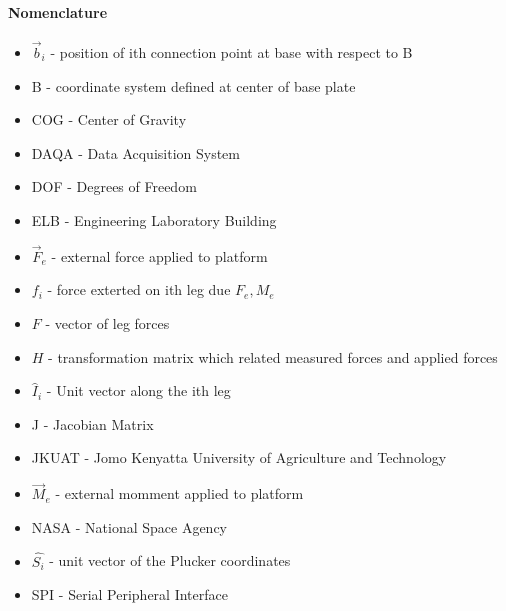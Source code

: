 \paragraph{Nomenclature}
\begin{itemize}
\item $\vec{b}_i$ - position of ith connection point at base with respect to B
\item B - coordinate system defined at center of base plate
\item COG - Center of Gravity
\item DAQA - Data Acquisition System
\item DOF - Degrees of Freedom
\item ELB - Engineering Laboratory Building
\item $\vec{F}_e$ - external force applied to platform
\item $f_i$ - force exterted on ith leg due $F_e, M_e$
\item $F$ - vector of leg forces
\item $H$ - transformation matrix which related measured forces and applied forces
\item $\hat{I}_i$ - Unit vector along the ith leg 
\item J - Jacobian Matrix 
\item JKUAT - Jomo Kenyatta University of Agriculture and Technology
\item $\vec{M}_e$ - external momment applied to platform
\item NASA - National Space Agency
\item $\hat{{S_{i}}}$ - unit vector of the Plucker coordinates
\item SPI - Serial Peripheral Interface
\end{itemize}
\pagebreak